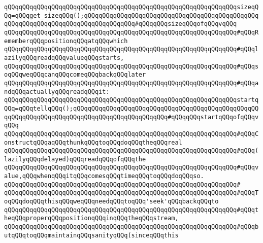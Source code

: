 \newline
\verb|qQQqqQQqqQQqqQQqqQQqqQQqqQQqqQQqqQQqqQQqqQQqqQQqqQQqqQQqqQQqqQQqsizeqQQq=qQQqget_sizeqQQq();qQQqqQQqqQQqqQQqqQQqqQQqqQQqqQQqqQQqqQQqqQQqqQQqqQQqqQQqqQQqqQQqqQQqqQQqqQQqqQQqqQQq#qQQqqQQqsizeqQQqofqQQqvqQQq|\newline
\newline
\newline
\newline
\verb|qQQqqQQqqQQqqQQqqQQqqQQqqQQqqQQqqQQqqQQqqQQqqQQqqQQqqQQqqQQqqQQq#qQQqRememberqQQqpositionqQQqatqQQqwhich|\newline
\verb|qQQqqQQqqQQqqQQqqQQqqQQqqQQqqQQqqQQqqQQqqQQqqQQqqQQqqQQqqQQqqQQq#qQQqlazilyqQQqreadqQQqvalueqQQqstarts,|\newline
\verb|qQQqqQQqqQQqqQQqqQQqqQQqqQQqqQQqqQQqqQQqqQQqqQQqqQQqqQQqqQQqqQQq#qQQqsoqQQqweqQQqcanqQQqcomeqQQqbackqQQqlater|\newline
\verb|qQQqqQQqqQQqqQQqqQQqqQQqqQQqqQQqqQQqqQQqqQQqqQQqqQQqqQQqqQQqqQQq#qQQqandqQQqactuallyqQQqreadqQQqit:|\newline
\newline
\verb|qQQqqQQqqQQqqQQqqQQqqQQqqQQqqQQqqQQqqQQqqQQqqQQqqQQqqQQqqQQqqQQqstartqQQq=qQQqtellqQQq();qQQqqQQqqQQqqQQqqQQqqQQqqQQqqQQqqQQqqQQqqQQqqQQqqQQqqQQqqQQqqQQqqQQqqQQqqQQqqQQqqQQqqQQqqQQqqQQq#qQQqqQQqstartqQQqofqQQqvqQQq|\newline
\newline
\newline
\newline
\verb|qQQqqQQqqQQqqQQqqQQqqQQqqQQqqQQqqQQqqQQqqQQqqQQqqQQqqQQqqQQqqQQq#qQQqConstructqQQqaqQQqthunkqQQqtoqQQqdoqQQqtheqQQqreal|\newline
\verb|qQQqqQQqqQQqqQQqqQQqqQQqqQQqqQQqqQQqqQQqqQQqqQQqqQQqqQQqqQQqqQQq#qQQq(lazilyqQQqdelayed)qQQqreadqQQqofqQQqthe|\newline
\verb|qQQqqQQqqQQqqQQqqQQqqQQqqQQqqQQqqQQqqQQqqQQqqQQqqQQqqQQqqQQqqQQq#qQQqvalue,qQQqwhenqQQqitqQQqcomesqQQqtimeqQQqtoqQQqdoqQQqso.|\newline
\verb|qQQqqQQqqQQqqQQqqQQqqQQqqQQqqQQqqQQqqQQqqQQqqQQqqQQqqQQqqQQqqQQq#|\newline
\verb|qQQqqQQqqQQqqQQqqQQqqQQqqQQqqQQqqQQqqQQqqQQqqQQqqQQqqQQqqQQqqQQq#qQQqToqQQqdoqQQqthisqQQqweqQQqneedqQQqtoqQQq'seek'qQQqbackqQQqto|\newline
\verb|qQQqqQQqqQQqqQQqqQQqqQQqqQQqqQQqqQQqqQQqqQQqqQQqqQQqqQQqqQQqqQQq#qQQqtheqQQqproperqQQqpositionqQQqinqQQqtheqQQqstream,|\newline
\verb|qQQqqQQqqQQqqQQqqQQqqQQqqQQqqQQqqQQqqQQqqQQqqQQqqQQqqQQqqQQqqQQq#qQQqbutqQQqtoqQQqmaintainqQQqsanityqQQq(sinceqQQqthis|\newline
